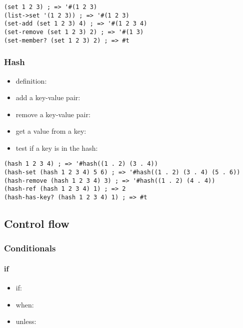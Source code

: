 \documentclass[a4paper,landscape,10pt]{article}
\begin{document}
\begin{multicols*}{2}
  \begin{lstlisting}[language=Racket]
(set 1 2 3) ; => '#(1 2 3)
(list->set '(1 2 3)) ; => '#(1 2 3)
(set-add (set 1 2 3) 4) ; => '#(1 2 3 4)
(set-remove (set 1 2 3) 2) ; => '#(1 3)
(set-member? (set 1 2 3) 2) ; => #t
  \end{lstlisting}

  \subsubsection{Hash}

  \begin{itemize}
    \item definition: 
    \item add a key-value pair: 
    \item remove a key-value pair: 
    \item get a value from a key: 
    \item test if a key is in the hash: 
  \end{itemize}

  \begin{lstlisting}[language=Racket]
(hash 1 2 3 4) ; => '#hash((1 . 2) (3 . 4))
(hash-set (hash 1 2 3 4) 5 6) ; => '#hash((1 . 2) (3 . 4) (5 . 6))
(hash-remove (hash 1 2 3 4) 3) ; => '#hash((1 . 2) (4 . 4))
(hash-ref (hash 1 2 3 4) 1) ; => 2
(hash-has-key? (hash 1 2 3 4) 1) ; => #t
  \end{lstlisting}

  \subsection{Control flow}

  \subsubsection{Conditionals}

  \paragraph{if}

  \begin{itemize}
    \item if: 
    \item when: 
    \item unless: 
  \end{itemize}


\end{multicols*}
\end{document}

